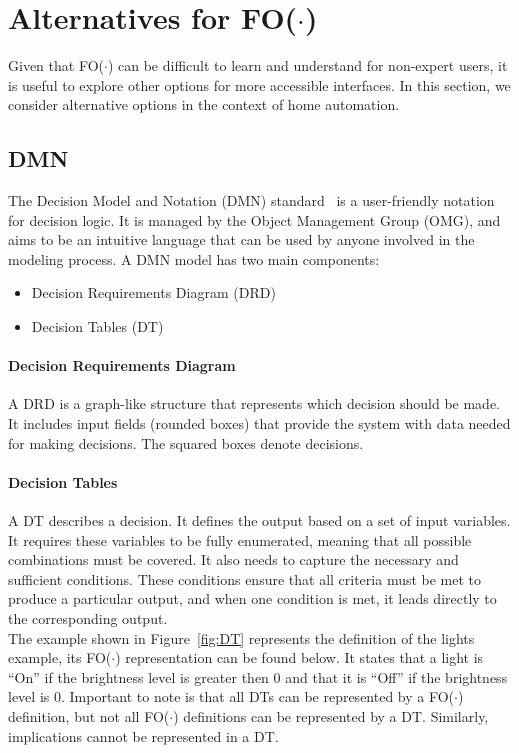 \documentclass[11pt,a4paper]{report}
\newcommand{\fodot}{FO($\cdot$)\xspace}
\begin{document}
\section{Alternatives for \fodot}
Given that \fodot can be difficult to learn and understand for non-expert users, it is useful to explore other options for more accessible interfaces. In this section, we consider alternative options in the context of home automation.

\subsection{DMN}
The Decision Model and Notation (DMN) standard~\cite{DMN} is a user-friendly notation for decision logic. It is managed by the Object Management Group (OMG), and aims to be an intuitive language that can be used by anyone involved in the modeling process. A DMN model has two main components:
\begin{itemize}
	\item Decision Requirements Diagram (DRD)
    \item Decision Tables (DT)
\end{itemize}

\paragraph{Decision Requirements Diagram}
A DRD is a graph-like structure that represents which decision should be made. It includes input fields (rounded boxes) that provide the system with data needed for making decisions. The squared boxes denote decisions.
\paragraph{Decision Tables}
A DT describes a decision. It defines the output based on a set of input variables. It requires these variables to be fully enumerated, meaning that all possible combinations must be covered. It also needs to capture the necessary and sufficient conditions. These conditions ensure that all criteria must be met to produce a particular output, and when one condition is met, it leads directly to the corresponding output.\\
The example shown in Figure~\ref{fig:DT} represents the definition of the lights example, its \fodot representation can be found below. It states that a light is ``On'' if the brightness level is greater then 0 and that it is ``Off'' if the brightness level is 0. Important to note is that all DTs can be represented by a \fodot definition, but not all \fodot definitions can be represented by a DT. Similarly, implications cannot be represented in a DT. 
\end{document}
